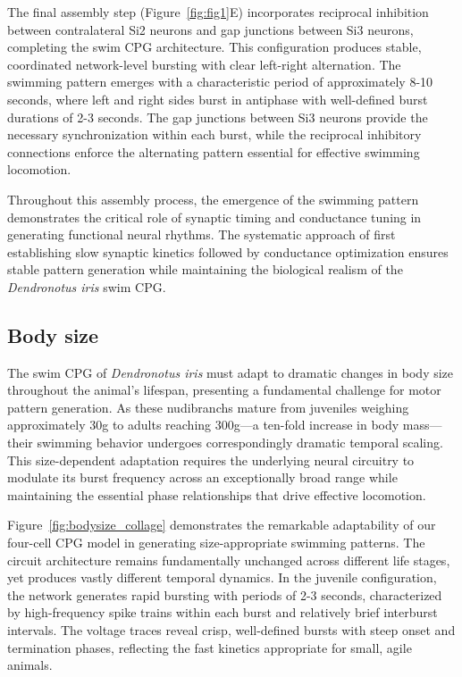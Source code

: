 \documentclass[nofootinbib,aip,amsmath,amssymb,reprint,twocolumn,10pt]{revtex4-2}
\begin{document}
The final assembly step (Figure~\ref{fig:fig1}E) incorporates reciprocal inhibition between contralateral Si2 neurons and gap junctions between Si3 neurons, completing the swim CPG architecture. This configuration produces stable, coordinated network-level bursting with clear left-right alternation. The swimming pattern emerges with a characteristic period of approximately 8-10 seconds, where left and right sides burst in antiphase with well-defined burst durations of 2-3 seconds. The gap junctions between Si3 neurons provide the necessary synchronization within each burst, while the reciprocal inhibitory connections enforce the alternating pattern essential for effective swimming locomotion.

Throughout this assembly process, the emergence of the swimming pattern demonstrates the critical role of synaptic timing and conductance tuning in generating functional neural rhythms. The systematic approach of first establishing slow synaptic kinetics followed by conductance optimization ensures stable pattern generation while maintaining the biological realism of the \textit{Dendronotus iris} swim CPG.

\subsection{Body size}

The swim CPG of \textit{Dendronotus iris} must adapt to dramatic changes in body size throughout the animal's lifespan, presenting a fundamental challenge for motor pattern generation. As these nudibranchs mature from juveniles weighing approximately 30g to adults reaching 300g—a ten-fold increase in body mass—their swimming behavior undergoes correspondingly dramatic temporal scaling. This size-dependent adaptation requires the underlying neural circuitry to modulate its burst frequency across an exceptionally broad range while maintaining the essential phase relationships that drive effective locomotion.

Figure~\ref{fig:bodysize_collage} demonstrates the remarkable adaptability of our four-cell CPG model in generating size-appropriate swimming patterns. The circuit architecture remains fundamentally unchanged across different life stages, yet produces vastly different temporal dynamics. In the juvenile configuration, the network generates rapid bursting with periods of 2-3 seconds, characterized by high-frequency spike trains within each burst and relatively brief interburst intervals. The voltage traces reveal crisp, well-defined bursts with steep onset and termination phases, reflecting the fast kinetics appropriate for small, agile animals.
\end{document}
